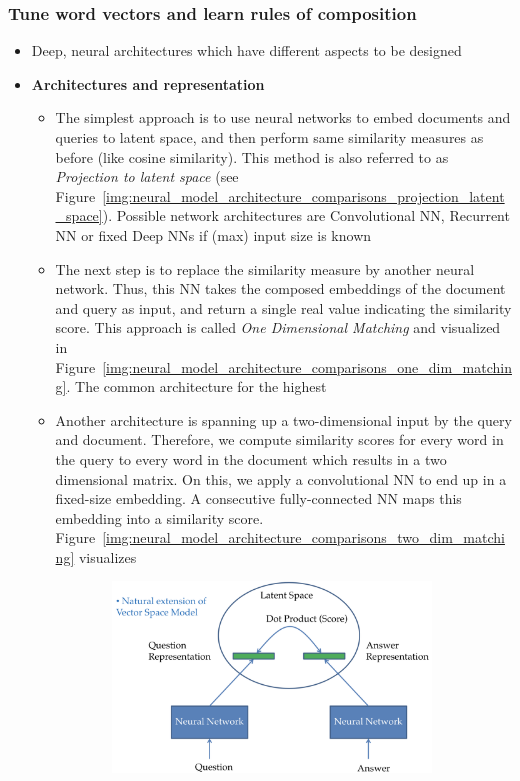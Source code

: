 \subsubsection{Tune word vectors and learn rules of composition}
\begin{itemize}
	\item Deep, neural architectures which have different aspects to be designed
	\item \textbf{Architectures and representation}
	\begin{itemize}
		\item The simplest approach is to use neural networks to embed documents and queries to latent space, and then perform same similarity measures as before (like cosine similarity). This method is also referred to as \textit{Projection to latent space} (see Figure~\ref{img:neural_model_architecture_comparisons_projection_latent_space}). Possible network architectures are Convolutional NN, Recurrent NN or fixed Deep NNs if (max) input size is known
		\item The next step is to replace the similarity measure by another neural network. Thus, this NN takes the composed embeddings of the document and query as input, and return a single real value indicating the similarity score. This approach is called \textit{One Dimensional Matching} and visualized in Figure~\ref{img:neural_model_architecture_comparisons_one_dim_matching}. The common architecture for the highest 
		\item Another architecture is spanning up a two-dimensional input by the query and document. Therefore, we compute similarity scores for every word in the query to every word in the document which results in a two dimensional matrix. On this, we apply a convolutional NN to end up in a fixed-size embedding. A consecutive fully-connected NN maps this embedding into a similarity score. Figure~\ref{img:neural_model_architecture_comparisons_two_dim_matching} visualizes 
	\end{itemize}
	\begin{figure}[ht]
		\centering
		\begin{subfigure}[b]{0.3\textwidth}
			\centering
			\includegraphics[width=\textwidth]{figures/neural_model_latent_space.png}

\end{subfigure}
\end{figure}
\end{itemize}

